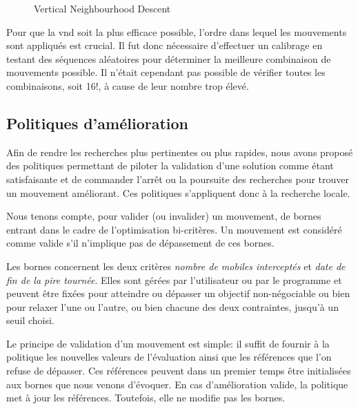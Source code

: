 			\begin{figure}[h!]

				\centering
				\begin{tikzpicture}
					
				\end{tikzpicture}
				\caption[UML -- VND]{Vertical Neighbourhood Descent}
				\label{uml:vnd}
			\end{figure}
			
			Pour que la \acrshort{vnd} soit la plus efficace possible, l'ordre dans lequel les mouvements sont appliqués est crucial. Il fut donc nécessaire d'effectuer un calibrage en testant des séquences aléatoires pour déterminer la meilleure combinaison de mouvements possible. Il n'était cependant pas possible de vérifier toutes les combinaisons, soit 16!, à cause de leur nombre trop élevé.
			

		\subsection{Politiques d'amélioration}
			Afin de rendre les recherches plus pertinentes ou plus rapides, nous avons proposé des politiques permettant de piloter la validation d'une solution comme étant satisfaisante et de commander l'arrêt ou la poursuite des recherches pour trouver un mouvement améliorant. Ces politiques s'appliquent donc à la recherche locale.

			Nous tenons compte, pour valider (ou invalider) un mouvement, de bornes entrant dans le cadre de l'optimisation bi-critères. Un mouvement est considéré comme valide s'il n'implique pas de dépassement de ces bornes. 

			Les bornes concernent les deux critères \emph{nombre de mobiles interceptés} et \emph{date de fin de la pire tournée}. Elles sont gérées par l'utilisateur ou par le programme et peuvent être fixées pour atteindre ou dépasser un objectif non-négociable ou bien pour relaxer l'une ou l'autre, ou bien chacune des deux contraintes, jusqu'à un seuil choisi.

			Le principe de validation d'un mouvement est simple: il suffit de fournir à la politique les nouvelles valeurs de l'évaluation ainsi que les références que l'on refuse de dépasser. Ces références peuvent dans un premier temps être initialisées aux bornes que nous venons d'évoquer. En cas d'amélioration valide, la politique met à jour les références. Toutefois, elle ne modifie pas les bornes.


